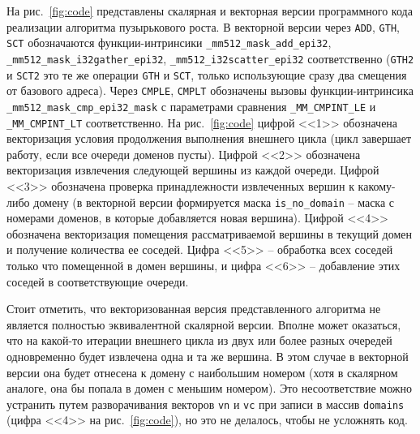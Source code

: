 \documentclass[
11pt,%
tightenlines,%
twoside,%
onecolumn,%
nofloats,%
nobibnotes,%
nofootinbib,%
superscriptaddress,%
noshowpacs,%
centertags]%
{revtex4}
\begin{document}
На рис.~\ref{fig:code} представлены скалярная и векторная версии программного кода реализации алгоритма пузырькового роста.
В векторной версии через \texttt{ADD}, \texttt{GTH}, \texttt{SCT} обозначаются функции-интринсики \texttt{\_mm512\_mask\_add\_epi32}, \texttt{\_mm512\_mask\_i32gather\_epi32}, \texttt{\_mm512\_i32scatter\_epi32} соответственно (\texttt{GTH2} и \texttt{SCT2} это те же операции \texttt{GTH} и \texttt{SCT}, только использующие сразу два смещения от базового адреса).
Через \texttt{CMPLE}, \texttt{CMPLT} обозначены вызовы функции-интринсика \texttt{\_mm512\_mask\_cmp\_epi32\_mask} с параметрами сравнения \texttt{\_MM\_CMPINT\_LE} и \texttt{\_MM\_CMPINT\_LT} соответственно.
На рис.~\ref{fig:code} цифрой <<1>> обозначена векторизация условия продолжения выполнения внешнего цикла (цикл завершает работу, если все очереди доменов пусты).
Цифрой <<2>> обозначена векторизация извлечения следующей вершины из каждой очереди.
Цифрой <<3>> обозначена проверка принадлежности извлеченных вершин к какому-либо домену (в векторной версии формируется маска \texttt{is\_no\_domain} -- маска с номерами доменов, в которые добавляется новая вершина).
Цифрой <<4>> обозначена векторизация помещения рассматриваемой вершины в текущий домен и получение количества ее соседей.
Цифра <<5>> -- обработка всех соседей только что помещенной в домен вершины, и цифра <<6>> -- добавление этих соседей в соответствующие очереди.

Стоит отметить, что векторизованная версия представленного алгоритма не является полностью эквивалентной скалярной версии.
Вполне может оказаться, что на какой-то итерации внешнего цикла из двух или более разных очередей одновременно будет извлечена одна и та же вершина.
В этом случае в векторной версии она будет отнесена к домену с наибольшим номером (хотя в скалярном аналоге, она бы попала в домен с меньшим номером).
Это несоответствие можно устранить путем разворачивания векторов \texttt{vn} и \texttt{vc} при записи в массив \texttt{domains} (цифра <<4>> на рис.~\ref{fig:code}), но это не делалось, чтобы не усложнять код.
\end{document}
